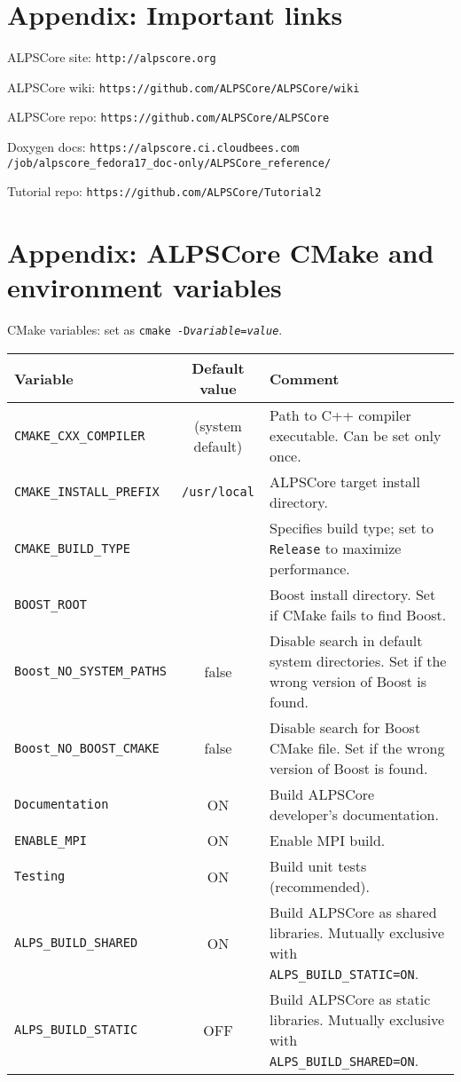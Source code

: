 \documentclass[12pt]{article}
\newcommand{\code}[1]{\texttt{#1}}
\begin{document}
\section{Appendix: Important links}
\begin{flushleft}
ALPSCore site: \nolinkurl{http://alpscore.org}

ALPSCore wiki: \nolinkurl{https://github.com/ALPSCore/ALPSCore/wiki}

ALPSCore repo: \nolinkurl{https://github.com/ALPSCore/ALPSCore}

Doxygen docs: \nolinkurl{https://alpscore.ci.cloudbees.com}
              \nolinkurl{/job/alpscore_fedora17_doc-only/ALPSCore_reference/}

Tutorial repo: \nolinkurl{https://github.com/ALPSCore/Tutorial2}
\end{flushleft}

\pagebreak
\section{Appendix: ALPSCore CMake and environment variables}
\label{ref:cmakevars}%
CMake variables: set as \code{cmake
  -D\textit{variable}=\textit{value}}.

{\small
\begin{tabularx}{\textwidth}{lcX}
  \textbf{Variable} & \textbf{Default value} & {\hfil\textbf{Comment}\hfil}\\
  \toprule
  \code{CMAKE\_CXX\_COMPILER} & (system default) & {Path to C++ compiler executable.
    Can be set only once.} \\\midrule
  \code{CMAKE\_INSTALL\_PREFIX} & \code{/usr/local} & ALPSCore target install directory. \\\midrule
  \code{CMAKE\_BUILD\_TYPE} &  &  {Specifies build type;
    set to \code{Release} to maximize performance.} \\\midrule
  \code{BOOST\_ROOT} &   & {Boost install directory.
    Set if CMake fails to find Boost.} \\\midrule
  \code{Boost\_NO\_SYSTEM\_PATHS} & false & {Disable search in default system directories.
    Set if the wrong version of Boost is found.} \\\midrule
  \code{Boost\_NO\_BOOST\_CMAKE} & false & {Disable search for Boost CMake file.
    Set if the wrong version of Boost is found.} \\\midrule
  \code{Documentation} & ON & Build ALPSCore developer's documentation. \\\midrule
  \code{ENABLE\_MPI} & ON & Enable MPI build. \\\midrule
  \code{Testing} & ON & Build unit tests (recommended). \\\midrule
  \code{ALPS\_BUILD\_SHARED} & ON & {Build ALPSCore as shared libraries.
    Mutually exclusive with \code{ALPS\_BUILD\_STATIC=ON}.} \\\midrule
  \code{ALPS\_BUILD\_STATIC} & OFF & {Build ALPSCore as static libraries.
    Mutually exclusive with \code{ALPS\_BUILD\_SHARED=ON}.} \\
  \bottomrule
\end{tabularx}
}
\end{document}
